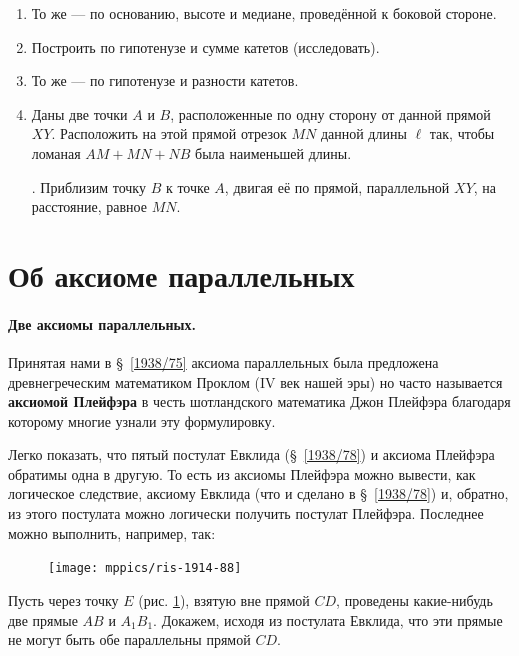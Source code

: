 \documentclass[twoside]{book}
\makeatletter
\newcommand{\rindex}[2][\imki@jobname]{%
  \index[#1]{\detokenize{#2}}%
}
\makeatother
\begin{document}
\begin{enumerate}[resume]
 \item
То же — по основанию, высоте и медиане, проведённой к боковой стороне.

 \item
Построить  по гипотенузе и сумме катетов (исследовать).

 \item
То же — по гипотенузе и разности катетов.

 \item
Даны две точки $A$ и $B$, расположенные по одну сторону от данной прямой $XY$.
Расположить на этой прямой отрезок $MN$ данной длины $\ell$ так, чтобы ломаная $AM+MN+NB$ была наименьшей длины.

\smallskip
{}.
Приблизим точку $B$ к точке $A$, двигая её по прямой, параллельной $XY$, на расстояние, равное $MN$.

\end{enumerate}



\section{Об аксиоме параллельных}

\paragraph{Две аксиомы параллельных.}\label{1914/91} 
Принятая нами в §~\ref{1938/75} аксиома параллельных была предложена древнегреческим математиком Проклом (IV век нашей эры) но часто называется \rindex{аксиома Плейфэра}\textbf{аксиомой Плейфэра} в честь шотландского математика Джон Плейфэра благодаря которому многие узнали эту формулировку.  

Легко показать, что пятый постулат Евклида (§~\ref{1938/78}) и аксиома Плейфэра обратимы одна в другую. 
То есть из аксиомы Плейфэра можно вывести, как логическое следствие, аксиому Евклида (что и сделано в §~\ref{1938/78}) и, обратно, из этого постулата можно логически получить постулат Плейфэра.
Последнее можно выполнить, например, так:

\begin{figure}
\centering
\texttt{[image: mppics/ris-1914-88]}
\caption{}\label{1914/ris-88}
\end{figure}

Пусть через точку $E$ (рис. \ref{1914/ris-88}), взятую вне прямой $CD$, проведены какие-нибудь две прямые $AB$ и $A_1B_1$.
Докажем, исходя из постулата Евклида, что эти прямые не могут быть обе параллельны прямой $CD$.
\end{document}
